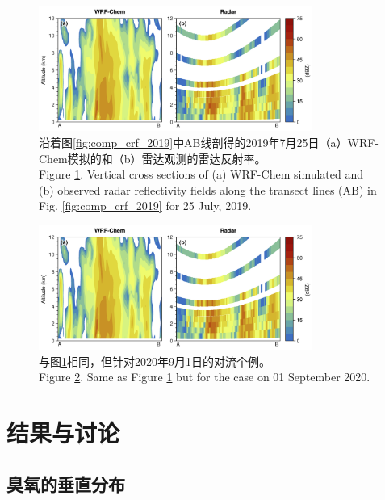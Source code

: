 \begin{figure}[!htbp]
\centering
\includegraphics[width=0.8\textwidth]{./figures/comp_dbzcross_2019.png}
\caption{沿着图\ref{fig:comp_crf_2019}中AB线剖得的2019年7月25日（a）WRF-Chem模拟的和（b）雷达观测的雷达反射率。\\
Figure \ref{fig:comp_dbzcross_2019}. Vertical cross sections of (a) WRF-Chem simulated and (b) observed radar reflectivity fields along the transect lines (AB) in Fig. \ref{fig:comp_crf_2019} for 25 July, 2019.}
\label{fig:comp_dbzcross_2019}
\end{figure}

\begin{figure}[!htbp]
\centering
\includegraphics[width=0.8\textwidth]{./figures/comp_dbzcross_2019.png}
\caption{与图\ref{fig:comp_dbzcross_2019}相同，但针对2020年9月1日的对流个例。\\
Figure \ref{fig:comp_dbzcross_2020}. Same as Figure \ref{fig:comp_dbzcross_2019} but for the case on 01 September 2020.}
\label{fig:comp_dbzcross_2020}
\end{figure}



\section{结果与讨论}

\subsection{臭氧的垂直分布}


